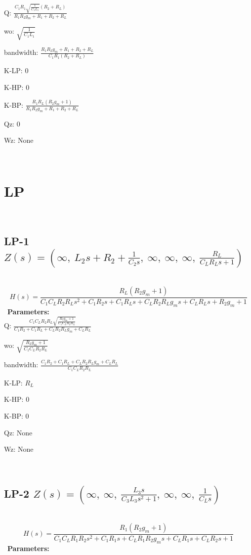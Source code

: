 \documentclass{article}
\begin{document}
Q: $\frac{C_{1} R_{1} \sqrt{\frac{1}{C_{1} L_{1}}} \left(R_{2} + R_{L}\right)}{R_{1} R_{2} g_{m} + R_{1} + R_{2} + R_{L}}$\ 

wo: $\sqrt{\frac{1}{C_{1} L_{1}}}$\ 

bandwidth: $\frac{R_{1} R_{2} g_{m} + R_{1} + R_{2} + R_{L}}{C_{1} R_{1} \left(R_{2} + R_{L}\right)}$\ 

K-LP: $0$\ 

K-HP: $0$\ 

K-BP: $\frac{R_{1} R_{L} \left(R_{2} g_{m} + 1\right)}{R_{1} R_{2} g_{m} + R_{1} + R_{2} + R_{L}}$\ 

Qz: $0$\ 

Wz: $\text{None}$\ 

\ 

\section{LP}\ 
\subsection{LP-1 $Z(s) = \left( \infty, \  L_{2} s + R_{2} + \frac{1}{C_{2} s}, \  \infty, \  \infty, \  \infty, \  \frac{R_{L}}{C_{L} R_{L} s + 1}\right)$ } \ 
\textbf{\[H(s) = \frac{R_{L} \left(R_{2} g_{m} + 1\right)}{C_{1} C_{L} R_{2} R_{L} s^{2} + C_{1} R_{2} s + C_{1} R_{L} s + C_{L} R_{2} R_{L} g_{m} s + C_{L} R_{L} s + R_{2} g_{m} + 1}\] } \ 
\textbf{Parameters:}\\ 

Q: $\frac{C_{1} C_{L} R_{2} R_{L} \sqrt{\frac{R_{2} g_{m} + 1}{C_{1} C_{L} R_{2} R_{L}}}}{C_{1} R_{2} + C_{1} R_{L} + C_{L} R_{2} R_{L} g_{m} + C_{L} R_{L}}$\ 

wo: $\sqrt{\frac{R_{2} g_{m} + 1}{C_{1} C_{L} R_{2} R_{L}}}$\ 

bandwidth: $\frac{C_{1} R_{2} + C_{1} R_{L} + C_{L} R_{2} R_{L} g_{m} + C_{L} R_{L}}{C_{1} C_{L} R_{2} R_{L}}$\ 

K-LP: $R_{L}$\ 

K-HP: $0$\ 

K-BP: $0$\ 

Qz: $\text{None}$\ 

Wz: $\text{None}$\ 

\ 

\subsection{LP-2 $Z(s) = \left( \infty, \  \infty, \  \frac{L_{3} s}{C_{3} L_{3} s^{2} + 1}, \  \infty, \  \infty, \  \frac{1}{C_{L} s}\right)$ } \ 
\textbf{\[H(s) = \frac{R_{1} \left(R_{2} g_{m} + 1\right)}{C_{1} C_{L} R_{1} R_{2} s^{2} + C_{1} R_{1} s + C_{L} R_{1} R_{2} g_{m} s + C_{L} R_{1} s + C_{L} R_{2} s + 1}\] } \ 
\textbf{Parameters:}\\ 
\end{document}
